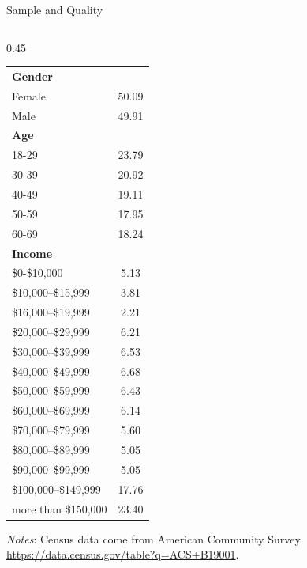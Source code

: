 \documentclass{beamer}
\begin{document}
\begin{frame}{Sample and Quality}
\begin{columns}[T]
\begin{column}{0.45\textwidth}
\begin{table}[!htbp]
\begin{threeparttable}
\begin{tabular}{lc}
\midrule
\textbf{Gender} \\
Female                  & 50.09 \\
Male                    & 49.91 \\[0.5em]
\textbf{Age} \\
18-29                  & 23.79 \\
30-39                  & 20.92 \\
40-49                  & 19.11 \\
50-59                  & 17.95 \\
60-69                  & 18.24 \\[0.5em]
\textbf{Income}\\
\$0-\$10,000        & 5.13 \\
\$10,000–\$15,999   & 3.81 \\
\$16,000–\$19,999   & 2.21 \\
\$20,000–\$29,999   & 6.21 \\
\$30,000–\$39,999   & 6.53 \\
\$40,000–\$49,999   & 6.68 \\
\$50,000–\$59,999   & 6.43 \\
\$60,000–\$69,999   & 6.14 \\
\$70,000–\$79,999   & 5.60 \\
\$80,000–\$89,999   & 5.05 \\
\$90,000–\$99,999   & 5.05 \\
\$100,000–\$149,999 & 17.76\\
more than \$150,000 & 23.40 \\
\bottomrule
\end{tabular}
\begin{tablenotes}[flushleft]
\item \textit{Notes}: Census data come from American Community Survey \url{https://data.census.gov/table?q=ACS+B19001}.  
\end{tablenotes}
\end{threeparttable}
\end{table}
  \end{column}
\end{columns}
\end{frame}
\end{document}
